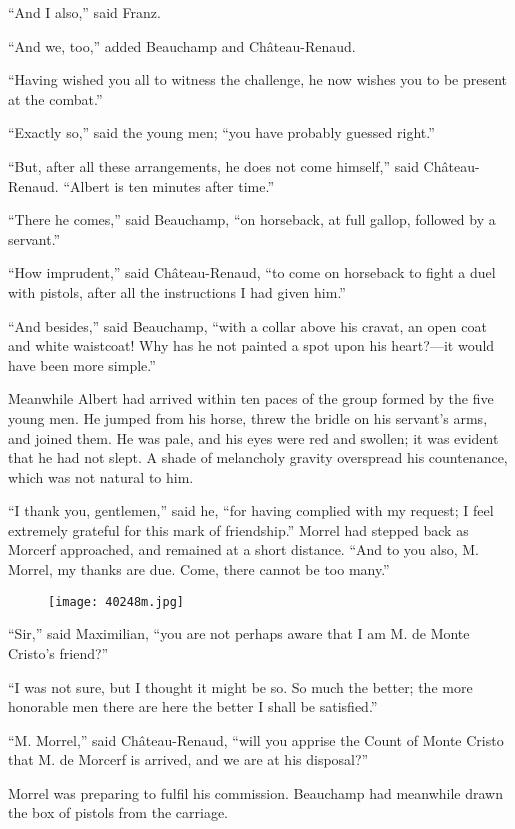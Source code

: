 “And I also,” said Franz.

“And we, too,” added Beauchamp and Château-Renaud.

“Having wished you all to witness the challenge, he now wishes you to
be present at the combat.”

“Exactly so,” said the young men; “you have probably guessed right.”

“But, after all these arrangements, he does not come himself,” said
Château-Renaud. “Albert is ten minutes after time.”

“There he comes,” said Beauchamp, “on horseback, at full gallop,
followed by a servant.”

“How imprudent,” said Château-Renaud, “to come on horseback to fight a
duel with pistols, after all the instructions I had given him.”

“And besides,” said Beauchamp, “with a collar above his cravat, an open
coat and white waistcoat! Why has he not painted a spot upon his
heart?—it would have been more simple.”

Meanwhile Albert had arrived within ten paces of the group formed by
the five young men. He jumped from his horse, threw the bridle on his
servant’s arms, and joined them. He was pale, and his eyes were red and
swollen; it was evident that he had not slept. A shade of melancholy
gravity overspread his countenance, which was not natural to him.

“I thank you, gentlemen,” said he, “for having complied with my
request; I feel extremely grateful for this mark of friendship.” Morrel
had stepped back as Morcerf approached, and remained at a short
distance. “And to you also, M. Morrel, my thanks are due. Come, there
cannot be too many.”

\begin{figure}[ht]
\texttt{[image: 40248m.jpg]}
\end{figure}

“Sir,” said Maximilian, “you are not perhaps aware that I am M. de
Monte Cristo’s friend?”

“I was not sure, but I thought it might be so. So much the better; the
more honorable men there are here the better I shall be satisfied.”

“M. Morrel,” said Château-Renaud, “will you apprise the Count of Monte
Cristo that M. de Morcerf is arrived, and we are at his disposal?”

Morrel was preparing to fulfil his commission. Beauchamp had meanwhile
drawn the box of pistols from the carriage.

